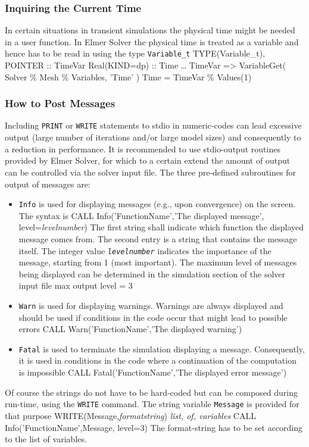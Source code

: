 \subsubsection{Inquiring the Current Time}
In certain situations in transient simulations the physical time might be needed in a user function. In Elmer Solver the physical time is treated as a variable and hence has to be read in using the type \texttt{Variable\_t}
\ttbegin
TYPE(Variable\_t), POINTER :: TimeVar
Real(KIND=dp) :: Time
\ldots
TimeVar => VariableGet( Solver \% Mesh \% Variables, 'Time' )
Time = TimeVar \% Values(1)
\ttend
\subsubsection{How to Post Messages}
Including \texttt{PRINT} or \texttt{WRITE} statements to stdio in numeric-codes can lead excessive output (large number of iterations and/or large model sizes) and consequently to a reduction in performance. It is recommended to use stdio-output routines provided by Elmer Solver, for which to a certain extend the amount of output can be controlled via the solver input file. The three pre-defined subroutines for output of messages are:
\begin{itemize}
\item \texttt{Info} is used for displaying messages (e.g., upon convergence) on the screen. The syntax is
\ttbegin
CALL Info('FunctionName','The displayed message', level=\textit{levelnumber})
\ttend
The first string shall indicate which function the displayed message comes from. The second entry is a string that contains the message itself. The integer value  \texttt{\textit{levelnumber}} indicates the importance of the message, starting from 1 (most important). The maximum level of messages being displayed can be determined in the simulation section  of the solver input file
\ttbegin
max output level = 3
\ttend
\item \texttt{Warn} is used for displaying warnings. Warnings are always displayed and should be used if conditions in the code occur that might lead to possible errors
\ttbegin
CALL Warn('FunctionName','The displayed warning')
\ttend
\item \texttt{Fatal} is used to terminate the simulation displaying a message. Consequently, it is used in conditions in the code where a continuation of the computation is impossible
\ttbegin
CALL Fatal('FunctionName','The displayed error message')
\ttend
\end{itemize}
Of course the strings do not have to be hard-coded but can be composed during run-time, using the \texttt{WRITE} command. The string variable \texttt{Message} is provided for that purpose
\ttbegin
WRITE(Message,\textit{formatstring}) \textit{list, of, variables}
CALL Info('FunctionName',Message, level=3)
\ttend
The format-string has to be set according to the list of variables. 
